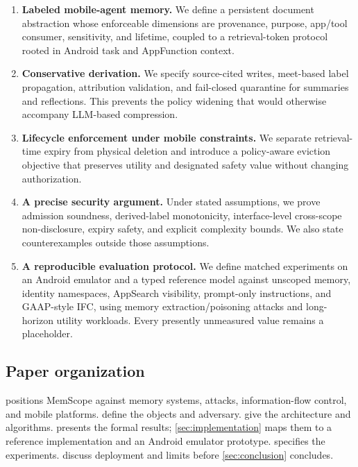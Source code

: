 \begin{enumerate}[leftmargin=*]
  \item \textbf{Labeled mobile-agent memory.} We define a persistent document abstraction whose enforceable dimensions are provenance, purpose, app/tool consumer, sensitivity, and lifetime, coupled to a retrieval-token protocol rooted in Android task and AppFunction context.
  \item \textbf{Conservative derivation.} We specify source-cited writes, meet-based label propagation, attribution validation, and fail-closed quarantine for summaries and reflections. This prevents the policy widening that would otherwise accompany LLM-based compression.
  \item \textbf{Lifecycle enforcement under mobile constraints.} We separate retrieval-time expiry from physical deletion and introduce a policy-aware eviction objective that preserves utility and designated safety value without changing authorization.
  \item \textbf{A precise security argument.} Under stated assumptions, we prove admission soundness, derived-label monotonicity, interface-level cross-scope non-disclosure, expiry safety, and explicit complexity bounds. We also state counterexamples outside those assumptions.
  \item \textbf{A reproducible evaluation protocol.} We define matched experiments on an Android emulator and a typed reference model against unscoped memory, identity namespaces, AppSearch visibility, prompt-only instructions, and GAAP-style IFC, using memory extraction/poisoning attacks and long-horizon utility workloads. Every presently unmeasured value remains a placeholder.
\end{enumerate}

\subsection{Paper organization}

 positions MemScope against memory systems, attacks, information-flow control, and mobile platforms.  define the objects and adversary.  give the architecture and algorithms.  presents the formal results; \cref{sec:implementation} maps them to a reference implementation and an Android emulator prototype.  specifies the experiments.  discuss deployment and limits before \cref{sec:conclusion} concludes.
